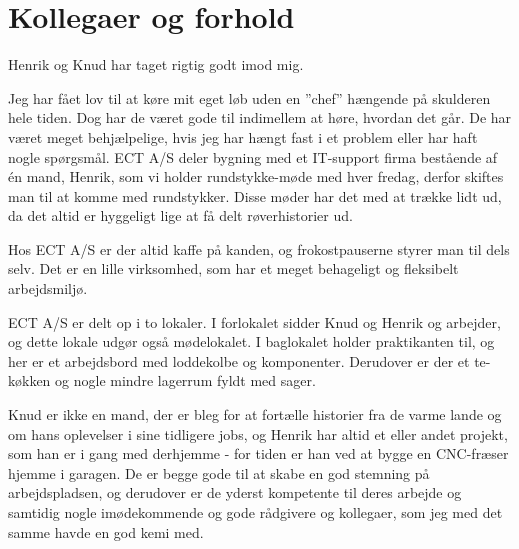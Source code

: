 \chapter{Kollegaer og forhold}

Henrik og Knud har taget rigtig godt imod mig. 

Jeg har fået lov til at køre mit eget løb uden en ''chef'' hængende på skulderen hele tiden. Dog har de været gode til indimellem at høre, hvordan det går. De har været meget behjælpelige, hvis jeg har hængt fast i et problem eller har haft nogle spørgsmål. ECT A/S deler bygning med et IT-support firma bestående af én mand, Henrik, som vi holder rundstykke-møde med hver fredag, derfor skiftes man til at komme med rundstykker. Disse møder har det med at trække lidt ud, da det altid er hyggeligt lige at få delt røverhistorier ud.

Hos ECT A/S er der altid kaffe på kanden, og frokostpauserne styrer man til dels selv. Det er en lille virksomhed, som har et meget behageligt og fleksibelt arbejdsmiljø.

ECT A/S er delt op i to lokaler. I forlokalet sidder Knud og Henrik og arbejder, og dette lokale udgør også mødelokalet. I baglokalet holder praktikanten til, og her er et arbejdsbord med loddekolbe og komponenter. Derudover er der et te-køkken og nogle mindre lagerrum fyldt med sager.

Knud er ikke en mand, der er bleg for at fortælle historier fra de varme lande og om hans oplevelser i sine tidligere jobs, og Henrik har altid et eller andet projekt, som han er i gang med derhjemme - for tiden er han ved at bygge en CNC-fræser hjemme i garagen. De er begge gode til at skabe en god stemning på arbejdspladsen, og derudover er de yderst kompetente til deres arbejde og samtidig nogle imødekommende og gode rådgivere og kollegaer, som jeg med det samme havde en god kemi med.  